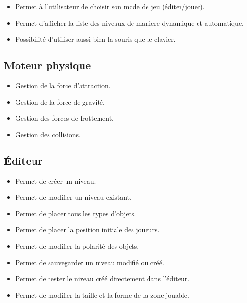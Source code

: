 \begin{itemize}
    \item Permet à l'utilisateur de choisir son mode de jeu (éditer/jouer).
    \item Permet d'afficher la liste des niveaux de maniere dynamique et automatique.
    \item Possibilité d'utiliser aussi bien la souris que le clavier.
\end{itemize}

\subsection{Moteur physique}

\begin{itemize}
    \item Gestion de la force d'attraction.
    \item Gestion de la force de gravité.
    \item Gestion des forces de frottement.
    \item Gestion des collisions.
\end{itemize}

\subsection{Éditeur}

\begin{itemize}
    \item Permet de créer un niveau.
    \item Permet de modifier un niveau existant.
    \item Permet de placer tous les types d'objets.
    \item Permet de placer la position initiale des joueurs.
    \item Permet de modifier la polarité des objets.
    \item Permet de sauvegarder un niveau modifié ou créé.
    \item Permet de tester le niveau créé directement dans l'éditeur.
    \item Permet de modifier la taille et la forme de la zone jouable.
\end{itemize}
